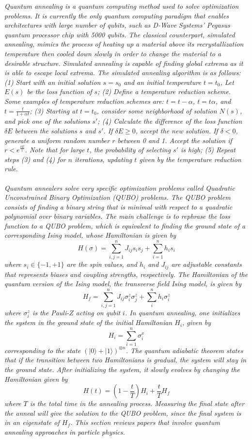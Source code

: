 \textit{Quantum annealing is a quantum computing method used to solve optimization problems. It is currently the only quantum computing paradigm that enables architectures with large number of qubits, such as D-Wave Systems' Pegasus quantum processor chip with 5000 qubits. The classical counterpart, simulated annealing, mimics the process of heating up a material above its recrystallization temperature then cooled down slowly in order to change the material to a desirable structure. Simulated annealing is capable of finding global extrema as it is able to escape local extrema. The simulated annealing algorithm is as follows: (1) Start with an initial solution $s = s_0$ and an initial temperature $t = t_0$, Let $E(s)$ be the loss function of $s$; (2) Define a temperature reduction scheme. Some examples of temperature reduction schemes are: $t = t - \alpha$, $t = t\alpha$, and $t = \frac{t}{1+\alpha t}$; (3) Starting at $t = t_0$, consider some neighborhood of solution $N(s)$, and pick one of the solutions $s'$; (4) Calculate the difference of the loss function $\delta E$ between the solutions $s$ and $s'$. If $\delta E \geq 0$, accept the new solution. If $\delta < 0$, generate a uniform random number $r$ between 0 and 1. Accept the solution if $r < e^{\frac{\delta E}{t}}$. Note that for large $t$, the probability of selecting $s'$ is high; (5) Repeat steps (3) and (4) for $n$ iterations, updating $t$ given by the temperature reduction rule. \\\\ Quantum annealers solve very specific optimization problems called Quadratic Unconstrained Binary Optimization (QUBO) problems. The QUBO problem consists of finding a binary string that is minimal with respect to a quadratic polynomial over binary variables. The main challenge is to rephrase the loss function to a QUBO problem, which is equivalent to finding the ground state of a corresponding Ising model, whose Hamiltonian is given by $$H(\sigma) = \sum_{i,j=1}^{n}J_{ij} s_i s_j + \sum_{i=1}^{n} h_i s_i$$where $s_i \in \{-1, +1\}$ are the spin values, and $h_i$ and $J_{ij}$ are adjustable constants that represents biases and coupling strengths, respectively. The Hamiltonian of the quantum version of the Ising model, the transverse field Ising model, is given by $$ H_f = \sum_{i,j = 1}^{n}J_{ij}\sigma_{i}^{z}\sigma_{j}^{z} + \sum_{i}^{n}h_i\sigma_{i}^{z} $$where $\sigma_{i}^{z}$ is the Pauli-$Z$ acting on qubit $i$. In quantum annealing, one initializes the system in the ground state of the initial Hamiltonian $H_i$, given by $$ H_i = \sum_{i=1}^{n}\sigma_{i}^{x} $$corresponding to the state $(| 0 \rangle + | 1 \rangle)^{\otimes n}$. The quantum adiabatic theorem states that if the transition between two Hamiltonians is gradual, the system will stay in the ground state. After initializing the system, it slowly evolves by changing the Hamiltonian given by $$ H(t) = \left(1 - \frac{t}{T}\right)H_i + \frac{t}{T} H_f $$where $T$ is the total time in the annealing process. Measuring the final state after the anneal will give the solution to the QUBO problem, since the final system is in an eigenstate of $H_f$. This section reviews papers that involve quantum annealing approaches in particle physics.}

